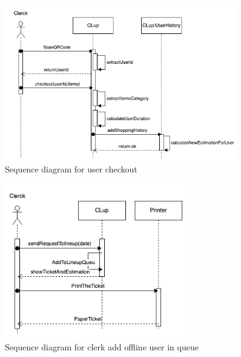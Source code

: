 \begin{figure}[H]
  \centering
  \includegraphics[width=0.9\textwidth,keepaspectratio]{images/Checkout_sd.png}
  \caption{Sequence diagram for user checkout}
\end{figure}

\begin{figure}[H]
  \centering
  \includegraphics[width=0.7\textwidth,keepaspectratio]{images/PrintTicket_sd.png}
  \caption{Sequence diagram for clerk add offline user in queue}
\end{figure}
\clearpage

\setcounter{tocdepth}{3}
\setcounter{secnumdepth}{3}

